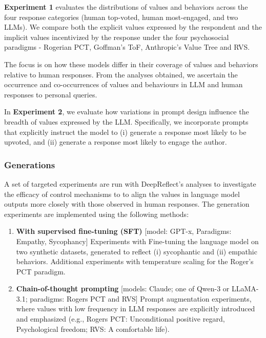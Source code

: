 \textbf{Experiment 1} evaluates the distributions of values and behaviors across the four response categories (human top-voted, human most-engaged, and two LLMs). We compare both the explicit values expressed by the respondent and the implicit values incentivized by the response under the four psychosocial paradigms - Rogerian PCT, Goffman’s ToF, Anthropic’s Value Tree and RVS.


The focus is on how these models differ in their coverage of values and behaviors relative to human responses. From the analyses obtained, we ascertain the occurrence and co-occurrences of values and behaviours in LLM and human responses to personal queries.


In \textbf{Experiment 2}, we evaluate how variations in prompt design influence the breadth of values expressed by the LLM. Specifically, we incorporate prompts that explicitly instruct the model to (i) generate a response most likely to be upvoted, and (ii) generate a response most likely to engage the author.


\subsubsection{Generations}
A set of targeted experiments are run with DeepReflect’s analyses to investigate the efficacy of control mechanisms to to align the values in language model outputs more closely with those observed in human responses. The generation experiments are implemented using the following methods:

\begin{enumerate}
    \item \textbf{With supervised fine-tuning (SFT)} [model: GPT-x, Paradigms: Empathy, Sycophancy]
Experiments with Fine-tuning the language model on two synthetic datasets, generated to reflect (i) sycophantic and (ii) empathic behaviors.
Additional experiments with temperature scaling for the Roger's PCT paradigm.

    \item \textbf{Chain-of-thought prompting} [models: Claude; one of Qwen-3 or LLaMA-3.1; paradigms: Rogers PCT and RVS]
Prompt augmentation experiments, where values with low frequency in LLM responses are explicitly introduced and emphasized (e.g., Rogers PCT: Unconditional positive regard, Psychological freedom; RVS: A comfortable life).
\end{enumerate}

    
